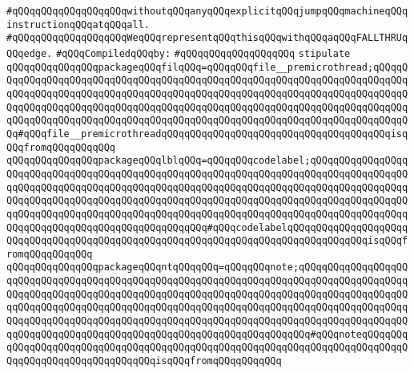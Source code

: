 \verb|#qQQqqQQqqQQqqQQqqQQqwithoutqQQqanyqQQqexplicitqQQqjumpqQQqmachineqQQqinstructionqQQqatqQQqall.|\newline
\verb|#qQQqqQQqqQQqqQQqqQQqWeqQQqrepresentqQQqthisqQQqwithqQQqaqQQqFALLTHRUqQQqedge.|\newline
\newline
\verb|#qQQqCompiledqQQqby:|\newline
\verb|#qQQqqQQqqQQqqQQqqQQq|\newline
\newline
\newline
\verb|stipulate|\newline
\verb|qQQqqQQqqQQqqQQqpackageqQQqfilqQQq=qQQqqQQqfile__premicrothread;qQQqqQQqqQQqqQQqqQQqqQQqqQQqqQQqqQQqqQQqqQQqqQQqqQQqqQQqqQQqqQQqqQQqqQQqqQQqqQQqqQQqqQQqqQQqqQQqqQQqqQQqqQQqqQQqqQQqqQQqqQQqqQQqqQQqqQQqqQQqqQQqqQQqqQQqqQQqqQQqqQQqqQQqqQQqqQQqqQQqqQQqqQQqqQQqqQQqqQQqqQQqqQQqqQQqqQQqqQQqqQQqqQQqqQQqqQQqqQQqqQQqqQQqqQQqqQQqqQQqqQQqqQQqqQQqqQQqqQQqqQQqqQQq#qQQqfile__premicrothreadqQQqqQQqqQQqqQQqqQQqqQQqqQQqqQQqqQQqqQQqisqQQqfromqQQqqQQqqQQq|\newline
\verb|qQQqqQQqqQQqqQQqpackageqQQqlblqQQq=qQQqqQQqcodelabel;qQQqqQQqqQQqqQQqqQQqqQQqqQQqqQQqqQQqqQQqqQQqqQQqqQQqqQQqqQQqqQQqqQQqqQQqqQQqqQQqqQQqqQQqqQQqqQQqqQQqqQQqqQQqqQQqqQQqqQQqqQQqqQQqqQQqqQQqqQQqqQQqqQQqqQQqqQQqqQQqqQQqqQQqqQQqqQQqqQQqqQQqqQQqqQQqqQQqqQQqqQQqqQQqqQQqqQQqqQQqqQQqqQQqqQQqqQQqqQQqqQQqqQQqqQQqqQQqqQQqqQQqqQQqqQQqqQQqqQQqqQQqqQQqqQQqqQQqqQQqqQQqqQQqqQQqqQQqqQQqqQQqqQQqqQQq#qQQqcodelabelqQQqqQQqqQQqqQQqqQQqqQQqqQQqqQQqqQQqqQQqqQQqqQQqqQQqqQQqqQQqqQQqqQQqqQQqqQQqqQQqqQQqisqQQqfromqQQqqQQqqQQq|\newline
\verb|qQQqqQQqqQQqqQQqpackageqQQqntqQQqqQQq=qQQqqQQqnote;qQQqqQQqqQQqqQQqqQQqqQQqqQQqqQQqqQQqqQQqqQQqqQQqqQQqqQQqqQQqqQQqqQQqqQQqqQQqqQQqqQQqqQQqqQQqqQQqqQQqqQQqqQQqqQQqqQQqqQQqqQQqqQQqqQQqqQQqqQQqqQQqqQQqqQQqqQQqqQQqqQQqqQQqqQQqqQQqqQQqqQQqqQQqqQQqqQQqqQQqqQQqqQQqqQQqqQQqqQQqqQQqqQQqqQQqqQQqqQQqqQQqqQQqqQQqqQQqqQQqqQQqqQQqqQQqqQQqqQQqqQQqqQQqqQQqqQQqqQQqqQQqqQQqqQQqqQQqqQQqqQQqqQQqqQQqqQQqqQQqqQQqqQQqqQQq#qQQqnoteqQQqqQQqqQQqqQQqqQQqqQQqqQQqqQQqqQQqqQQqqQQqqQQqqQQqqQQqqQQqqQQqqQQqqQQqqQQqqQQqqQQqqQQqqQQqqQQqqQQqqQQqisqQQqfromqQQqqQQqqQQq|\newline

